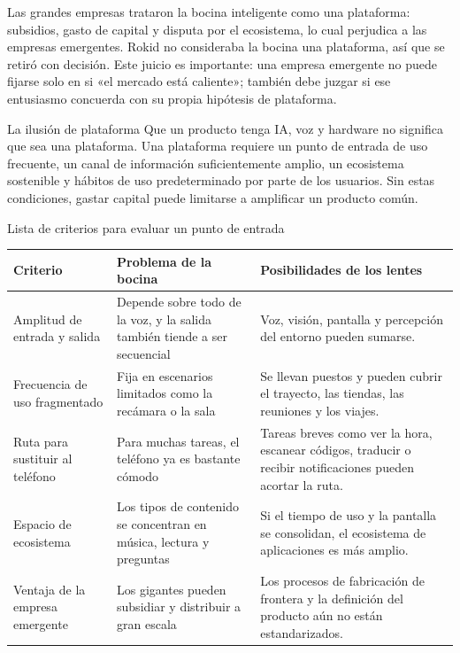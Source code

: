 \documentclass[a4paper]{article}
\begin{document}
Las grandes empresas trataron la bocina inteligente como una plataforma: subsidios, gasto de capital y disputa por el ecosistema, lo cual perjudica a las empresas emergentes. Rokid no consideraba la bocina una plataforma, así que se retiró con decisión. Este juicio es importante: una empresa emergente no puede fijarse solo en si «el mercado está caliente»; también debe juzgar si ese entusiasmo concuerda con su propia hipótesis de plataforma.

\begin{warningbox}{La ilusión de plataforma}
Que un producto tenga IA, voz y hardware no significa que sea una plataforma. Una plataforma requiere un punto de entrada de uso frecuente, un canal de información suficientemente amplio, un ecosistema sostenible y hábitos de uso predeterminado por parte de los usuarios. Sin estas condiciones, gastar capital puede limitarse a amplificar un producto común.
\end{warningbox}

\begin{knowledgebox}{Lista de criterios para evaluar un punto de entrada}
\noindent\begin{tabularx}{\textwidth}{p{}p{}X}
\toprule
Criterio & Problema de la bocina & Posibilidades de los lentes \\
\midrule
Amplitud de entrada y salida & Depende sobre todo de la voz, y la salida también tiende a ser secuencial & Voz, visión, pantalla y percepción del entorno pueden sumarse. \\
Frecuencia de uso fragmentado & Fija en escenarios limitados como la recámara o la sala & Se llevan puestos y pueden cubrir el trayecto, las tiendas, las reuniones y los viajes. \\
Ruta para sustituir al teléfono & Para muchas tareas, el teléfono ya es bastante cómodo & Tareas breves como ver la hora, escanear códigos, traducir o recibir notificaciones pueden acortar la ruta. \\
Espacio de ecosistema & Los tipos de contenido se concentran en música, lectura y preguntas & Si el tiempo de uso y la pantalla se consolidan, el ecosistema de aplicaciones es más amplio. \\
Ventaja de la empresa emergente & Los gigantes pueden subsidiar y distribuir a gran escala & Los procesos de fabricación de frontera y la definición del producto aún no están estandarizados. \\
\bottomrule
\end{tabularx}
\end{knowledgebox}
\end{document}
